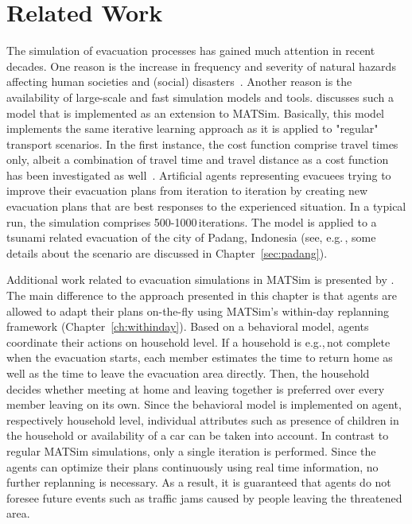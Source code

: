 \section{Related Work}
The simulation of evacuation processes has gained much attention in recent decades. One reason is the increase in frequency and severity of natural hazards affecting human societies and (social) disasters~\citep{Rodr2006HBoDisasterResearch}. Another reason is the availability of large-scale and fast simulation models and tools. \citet{Laemmel_PhDThesis_2011} discusses such a model that is implemented as an extension to MATSim. Basically, this model implements the same iterative learning approach as it is applied to "regular" transport scenarios. In the first instance, the cost function comprise travel times only, albeit a combination of travel time and travel distance as a cost function has been investigated as well~\citep{LaemmelKluepfelNagel2009EvacPadangAtBookTimmermanns}. 
Artificial agents representing evacuees trying to improve their evacuation plans from iteration to iteration by creating new evacuation plans that are best responses to the experienced situation. 
In a typical run, the simulation comprises 500-1000\,iterations. 
The model is applied to a tsunami related evacuation of the city of Padang, Indonesia (see, e.g.\,\citep{TaubenboeckEtAl2012ConcludingLastMilePaperNatHazards,GosebergEtAl2012LastLastMile}, some details about the scenario are discussed in Chapter~\ref{sec:padang}). 

Additional work related to evacuation simulations in MATSim is presented by \citet{Dobler_PhDThesis_2013}. The main difference to the approach presented in this chapter is that agents are allowed to adapt their plans on-the-fly using MATSim's within-day replanning framework \citep{DoblerEtAl_TRR_2012} (Chapter~\ref{ch:withinday}). 
Based on a behavioral model, agents coordinate their actions on household level. If a household is e.g.,\,not complete when the evacuation starts, each member estimates the time to return home as well as the time to leave the evacuation area directly. Then, the household decides whether meeting at home and leaving together is preferred over every member leaving on its own.
Since the behavioral model is implemented on agent, respectively household level, individual attributes such as presence of children in the household or availability of a car can be taken into account.
In contrast to regular MATSim simulations, only a single iteration is performed. Since the agents can optimize their plans continuously using real time information, no further replanning is necessary. As a result, it is guaranteed that agents do not foresee future events such as traffic jams caused by people leaving the threatened area.

